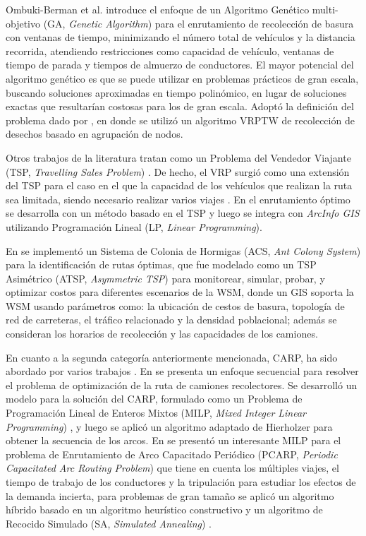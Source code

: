 \documentclass[conference]{IEEEtran}
\begin{document}
Ombuki-Berman et al. \cite{Ombuki-Berman2007WASTEALGORITHMS} introduce el enfoque de un Algoritmo Genético multi-objetivo (GA, \textit{Genetic Algorithm}) para el enrutamiento de recolección de basura con ventanas de tiempo, minimizando el número total de vehículos y la distancia recorrida, atendiendo restricciones como capacidad de vehículo, ventanas de tiempo de parada y tiempos de almuerzo de conductores. El mayor potencial del algoritmo genético es que se puede utilizar en problemas prácticos de gran escala, buscando soluciones aproximadas en tiempo polinómico, en lugar de soluciones exactas que resultarían costosas para los de gran escala. Adoptó la definición del problema dado por \cite{Kim2006WasteWindows}, en donde se utilizó un algoritmo VRPTW de recolección de desechos basado en agrupación de nodos.

Otros trabajos de la literatura tratan como un Problema del Vendedor Viajante (TSP, \textit{Travelling Sales Problem}) \cite{Karadimas2007OptimalAlgorithm}. De hecho, el VRP surgió como una extensión del TSP para el caso en el que la capacidad de los vehículos que realizan la ruta sea limitada, siendo necesario realizar varios viajes \cite{CalvinoM2011CooperacionPanoramica}. En \cite{Billa2014GISOptimization} el enrutamiento óptimo se desarrolla con un método basado en el TSP y luego se integra con \textit{ArcInfo GIS} utilizando Programación Lineal (LP, \textit{Linear Programming})\cite{Nocedal1999NumericalOptimization, Rao2009EngineeringEdition}.

En \cite{Karadimas2007OptimalAlgorithm} se implementó un Sistema de Colonia de Hormigas (ACS, \textit{Ant Colony System}) para la identificación de rutas óptimas, que fue modelado como un TSP Asimétrico (ATSP, \textit{Asymmetric TSP}) para monitorear, simular, probar, y optimizar costos para diferentes escenarios de la WSM, donde un GIS soporta la WSM usando parámetros como: la ubicación de cestos de basura, topología de red de carreteras, el tráfico relacionado y la densidad poblacional; además se consideran los horarios de recolección y las capacidades de los camiones.

En cuanto a la segunda categoría anteriormente mencionada, CARP, ha sido abordado por varios trabajos \cite{Vecchi2016ACollection,Tirkolaee2018ATime,Braier2017AnArgentina}. En \cite{Vecchi2016ACollection} se presenta un enfoque secuencial para resolver el problema de optimización de la ruta de camiones recolectores. Se desarrolló un modelo para la solución del CARP, formulado como un Problema de Programación Lineal de Enteros Mixtos (MILP, \textit{Mixed Integer Linear Programming}) \cite{Conforti2014IntegerProgramming}, y luego se aplicó un algoritmo adaptado de Hierholzer para obtener la secuencia de los arcos. En \cite{Tirkolaee2018ATime} se presentó un interesante MILP para el problema de Enrutamiento de Arco Capacitado Periódico (PCARP, \textit{Periodic Capacitated Arc Routing Problem}) que tiene en cuenta los múltiples viajes, el tiempo de trabajo de los conductores y la tripulación para estudiar los efectos de la demanda incierta, para problemas de gran tamaño se aplicó un algoritmo híbrido basado en un algoritmo heurístico constructivo y un algoritmo de Recocido Simulado (SA, \textit{Simulated Annealing}) \cite{Bertsimas1993SimulatedAnnealing}.
\end{document}
